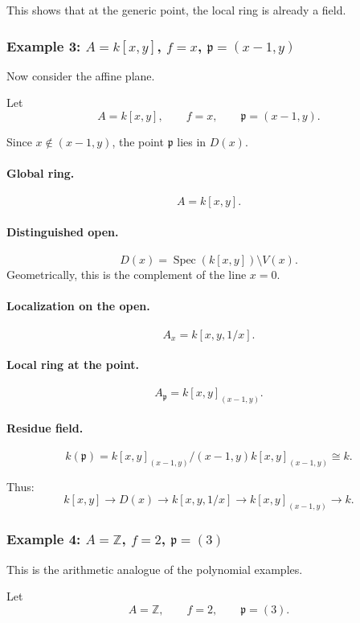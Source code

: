\documentclass[12pt,a4paper]{article}
\theoremstyle{notespace}
\newcommand{\Spec}{\operatorname{Spec}}
\newcommand{\mf}{\mathfrak}
\theoremstyle{definition}
\begin{document}
This shows that at the generic point, the local ring is already a field.

\subsubsection{Example 3: \(A=k[x,y]\), \(f=x\), \(\mf p=(x-1,y)\)}

Now consider the affine plane.

Let
\[
A=k[x,y],
\qquad
f=x,
\qquad
\mf p=(x-1,y).
\]

Since \(x\notin (x-1,y)\), the point \(\mf p\) lies in \(D(x)\).

\paragraph{Global ring.}
\[
A=k[x,y].
\]

\paragraph{Distinguished open.}
\[
D(x)=\Spec(k[x,y])\setminus V(x).
\]
Geometrically, this is the complement of the line \(x=0\).

\paragraph{Localization on the open.}
\[
A_x=k[x,y,1/x].
\]

\paragraph{Local ring at the point.}
\[
A_{\mf p}=k[x,y]_{(x-1,y)}.
\]

\paragraph{Residue field.}
\[
k(\mf p)=k[x,y]_{(x-1,y)}/(x-1,y)k[x,y]_{(x-1,y)}\cong k.
\]

Thus:
\[
k[x,y]
\longrightarrow
D(x)
\longrightarrow
k[x,y,1/x]
\longrightarrow
k[x,y]_{(x-1,y)}
\longrightarrow
k.
\]

\subsubsection{Example 4: \(A=\mathbb Z\), \(f=2\), \(\mf p=(3)\)}

This is the arithmetic analogue of the polynomial examples.

Let
\[
A=\mathbb Z,
\qquad
f=2,
\qquad
\mf p=(3).
\]
\end{document}
